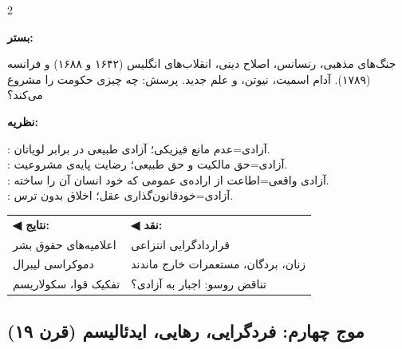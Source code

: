 \begin{tcolorbox}[mybox, title={موج سوم | مدرن اولیه | \lr{1600 -- 1800}},
  colframe=EraEarlyMod, colback=EraEarlyMod!5,
  boxed title style={colback=EraEarlyMod}]

\begin{multicols}{2}

\textbf{\color{EraEarlyMod}بستر:}

جنگ‌های مذهبی، رنسانس، اصلاح دینی، انقلاب‌های انگلیس (۱۶۴۲ و ۱۶۸۸) و فرانسه (۱۷۸۹). آدام اسمیت، نیوتن، و علم جدید. پرسش: چه چیزی حکومت را مشروع می‌کند؟

\columnbreak

\textbf{\color{EraEarlyMod}نظریه:}

: آزادی=عدم مانع فیزیکی؛ آزادی طبیعی در برابر لویاتان.\\
: آزادی=حق مالکیت و حق طبیعی؛ رضایت پایه‌ی مشروعیت.\\
: آزادی واقعی=اطاعت از اراده‌ی عمومی که خود انسان آن را ساخته.\\
: آزادی=خودقانون‌گذاری عقل؛ اخلاق بدون ترس.

\end{multicols}

\vspace{0.3cm}
\begin{tabular}{p{5cm}p{5cm}}
\textcolor{AccentGreen}{\textbf{◀ نتایج:}} & \textcolor{AccentRed}{\textbf{◀ نقد:}} \\
اعلامیه‌های حقوق بشر & قراردادگرایی انتزاعی \\
دموکراسی لیبرال & زنان، بردگان، مستعمرات خارج ماندند \\
تفکیک قوا، سکولاریسم & تناقض روسو: اجبار به آزادی؟ \\
\end{tabular}

\end{tcolorbox}

\subsection{موج چهارم: فردگرایی، رهایی، ایدئالیسم (قرن ۱۹)}
\label{subsec:wave4}

